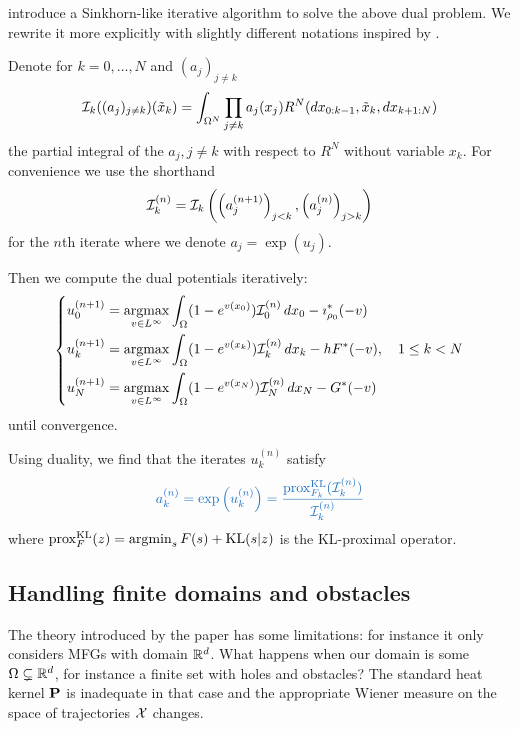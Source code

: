 \documentclass[../report.tex]{subfiles}
\begin{document}
\textcite{benamou2018entropy} introduce a Sinkhorn-like iterative algorithm to solve the above dual problem. We rewrite it more explicitly with slightly different notations inspired by \cite{chizat2016scaling}.

\begin{prop}\label{algo:Algo1}
	Denote for $k=0,\ldots,N$ and $(a_j)_{j\neq k}$
	\[
	\mathcal{I}_k((a_j)_{j\neq k})(\tilde{x}_k) = 
	\int_{\Omega^N}
	\prod_{j\neq k} a_j(x_j)
	R^N(dx_{0:k-1}, \tilde{x}_k, dx_{k+1:N})
	\]
	the partial integral of the $a_j,j\neq k$ with respect to $R^N$ without variable $x_k$.
	For convenience we use the shorthand
	\[
	\mathcal{I}_k^{(n)} = \mathcal{I}_k\left(\left(a^{(n+1)}_j\right)_{j<k},
	\left(a^{(n)}_j\right)_{j>k}\right)
	\]
	for the $n$th iterate where we denote $a_j = \exp(u_j)$.
	
	Then we compute the dual potentials iteratively:
	\begin{equation}
	\begin{dcases}
	u_0^{(n+1)} = \operatorname*{argmax}_{v \in L^\infty} \int_{\Omega} (1 - e^{v(x_0)}) \mathcal{I}_0^{(n)} \,dx_0 - \imath_{\rho_0}^*(-v) \\
	u_k^{(n+1)} = \operatorname*{argmax}_{v \in L^\infty} \int_{\Omega} (1- e^{v(x_k)}) \mathcal{I}_k^{(n)} \,dx_k - hF^*(-v) ,
	\quad 1\leq k < N  \\
	u_N^{(n+1)} = \operatorname*{argmax}_{v \in L^\infty} \int_{\Omega} (1 - e^{v(x_N)}) \mathcal{I}_N^{(n)} \,dx_N - G^*(-v)
	\end{dcases}
	\end{equation}
	until convergence.
	
	Using duality, we find that the iterates $u_k^{(n)}$ satisfy
	\begin{equation}
	{\bluefont
	a_k^{(n)} = \exp\left(u^{(n)}_k\right) =
	\frac{
		\prox_{F_k}^{\KL}(\calI_k^{(n)})
	}{\calI_k^{(n)}}}
	\end{equation}
	where $\operatorname{prox}_F^{\operatorname{KL}}(z) = \operatorname*{argmin}_{s} F(s) + \operatorname{KL}(s|z)$ is the KL-proximal operator.
\end{prop}


\subsection{Handling finite domains and obstacles}\label{sec:Finitedomainobstacles}

The theory introduced by the paper has some limitations: for instance it only considers MFGs with domain $\mathbb{R}^d$. What happens when our domain is some $\Omega \subsetneq \mathbb{R}^d$, for instance a finite set with holes and obstacles? The standard heat kernel $\mathbf{P}$ is inadequate in that case and the appropriate Wiener measure on the space of trajectories $\mathcal{X}$ changes.
\end{document}
